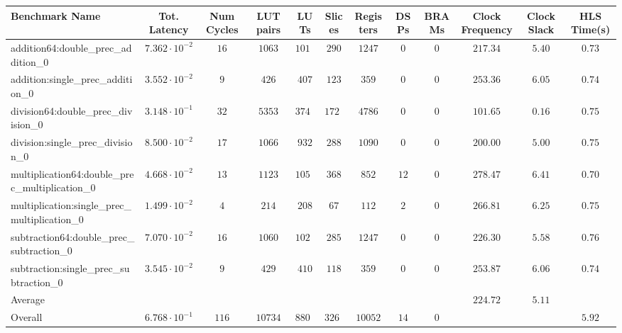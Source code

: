 \begin{tabular}{|l|c|c|c|c|c|c|c|c|c|c|c|}
\hline
Benchmark Name                                   & Tot. Latency            & Num Cycles & LUT pairs & LUTs     & Slices   & Registers & DSPs   & BRAMs & Clock Frequency & Clock Slack & HLS Time(s) \\
\hline
addition64:double\_prec\_addition\_0             & $ 7.362 \cdot 10^{-2} $ & $ 16     $ & $ 1063  $ & $ 1018 $ & $ 290  $ & $ 1247  $ & $ 0  $ & $ 0 $ & $ 217.34      $ & $ 5.40    $ & $ 0.73    $ \\
addition:single\_prec\_addition\_0               & $ 3.552 \cdot 10^{-2} $ & $ 9      $ & $ 426   $ & $ 407  $ & $ 123  $ & $ 359   $ & $ 0  $ & $ 0 $ & $ 253.36      $ & $ 6.05    $ & $ 0.74    $ \\
division64:double\_prec\_division\_0             & $ 3.148 \cdot 10^{-1} $ & $ 32     $ & $ 5353  $ & $ 3747 $ & $ 1727 $ & $ 4786  $ & $ 0  $ & $ 0 $ & $ 101.65      $ & $ 0.16    $ & $ 0.75    $ \\
division:single\_prec\_division\_0               & $ 8.500 \cdot 10^{-2} $ & $ 17     $ & $ 1066  $ & $ 932  $ & $ 288  $ & $ 1090  $ & $ 0  $ & $ 0 $ & $ 200.00      $ & $ 5.00    $ & $ 0.75    $ \\
multiplication64:double\_prec\_multiplication\_0 & $ 4.668 \cdot 10^{-2} $ & $ 13     $ & $ 1123  $ & $ 1058 $ & $ 368  $ & $ 852   $ & $ 12 $ & $ 0 $ & $ 278.47      $ & $ 6.41    $ & $ 0.70    $ \\
multiplication:single\_prec\_multiplication\_0   & $ 1.499 \cdot 10^{-2} $ & $ 4      $ & $ 214   $ & $ 208  $ & $ 67   $ & $ 112   $ & $ 2  $ & $ 0 $ & $ 266.81      $ & $ 6.25    $ & $ 0.75    $ \\
subtraction64:double\_prec\_subtraction\_0       & $ 7.070 \cdot 10^{-2} $ & $ 16     $ & $ 1060  $ & $ 1028 $ & $ 285  $ & $ 1247  $ & $ 0  $ & $ 0 $ & $ 226.30      $ & $ 5.58    $ & $ 0.76    $ \\
subtraction:single\_prec\_subtraction\_0         & $ 3.545 \cdot 10^{-2} $ & $ 9      $ & $ 429   $ & $ 410  $ & $ 118  $ & $ 359   $ & $ 0  $ & $ 0 $ & $ 253.87      $ & $ 6.06    $ & $ 0.74    $ \\
\hline
Average                                          & $                     $ & $        $ & $       $ & $      $ & $      $ & $       $ & $    $ & $   $ & $ 224.72      $ & $ 5.11    $ & $         $ \\
\hline
Overall                                          & $ 6.768 \cdot 10^{-1} $ & $ 116    $ & $ 10734 $ & $ 8808 $ & $ 3266 $ & $ 10052 $ & $ 14 $ & $ 0 $ & $             $ & $         $ & $ 5.92    $ \\
\hline
\end{tabular}
